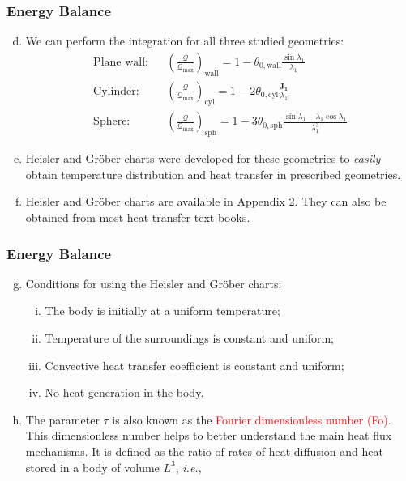 \documentclass[10pt,compress,unknownkeysallowed]{beamer}
\newcommand{\ie}{{\it i.e., }}
\newcommand{\frc}{\displaystyle\frac}
\newcommand{\red}{\textcolor{red}}
\begin{document}
\begin{frame}
 \frametitle{Energy Balance}
   \begin{enumerate}[(a)]\setcounter{enumi}{3}%
     \item<1-> We can perform the integration for all three  studied geometries:
          \begin{eqnarray}
            \text{Plane wall:} && \left(\frc{\mathcal{Q}}{\mathcal{Q}_{\text{max}}}\right)_{\text{wall}} = 1 - \theta_{0,\text{wall}}\frc{\sin{\lambda_{1}}}{\lambda_{1}}\label{hessler:wall} \\
            \text{Cylinder:} && \left(\frc{\mathcal{Q}}{\mathcal{Q}_{\text{max}}}\right)_{\text{cyl}} = 1- 2\theta_{0,\text{cyl}}\frc{\mathbf{J_{1}}}{\lambda_{1}}\label{hessler:cylinder} \\
            \text{Sphere:} && \left(\frc{\mathcal{Q}}{\mathcal{Q}_{\text{max}}}\right)_{\text{sph}} = 1 - 3\theta_{0,\text{sph}}\frc{\sin{\lambda_{1}}-\lambda_{1}\cos{\lambda_{1}}}{\lambda_{1}^{3}}\label{hessler:sphere}
          \end{eqnarray}
      \item<2-> Heisler and Gr\"ober charts were developed for these geometries to {\it easily} obtain temperature distribution and heat transfer in prescribed geometries. 
      \item<3-> Heisler and Gr\"ober charts are available in Appendix 2. They can also be obtained from most heat transfer text-books.      
   \end{enumerate} 
\end{frame}

\begin{frame}
 \frametitle{Energy Balance}
   \begin{enumerate}[(a)]\setcounter{enumi}{6}%
     \item<1-> Conditions for using the Heisler and Gr\"ober charts:
        \begin{enumerate}[(i)]
           \item<2-> The body is initially at a uniform temperature;
           \item<2-> Temperature of the surroundings is constant and uniform;
           \item<2-> Convective heat transfer coefficient is constant and uniform;
           \item<2-> No heat generation in the body.
        \end{enumerate}
     \item<3-> The parameter $\tau$ is also known as the \red{Fourier dimensionless number (Fo)}. This dimensionless number helps to better understand the main heat flux mechanisms. It is defined as the ratio of rates of heat diffusion and heat stored in a body of volume $L^{3}$, \ie
        \visible<3->{\begin{displaymath}
               Fo = \frc{\alpha t}{L^{2}} = \tau
        \end{displaymath}} 
   \end{enumerate} 
\end{frame}
\end{document}
